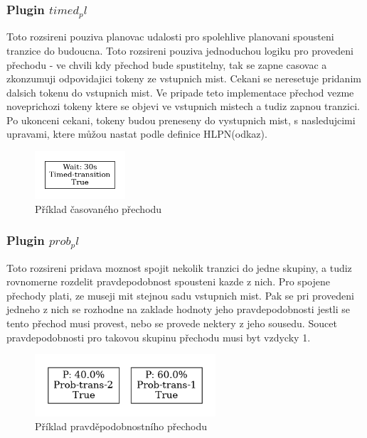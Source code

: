 \subsubsection{Plugin $timed_pl$}
\label{subsec:timed_pl}
Toto rozsireni pouziva planovac udalosti pro spolehlive planovani spousteni tranzice do budoucna. Toto rozsireni pouziva jednoduchou logiku pro provedeni přechodu - ve chvili kdy přechod bude spustitelny, tak se zapne casovac a zkonzumuji odpovidajici tokeny ze vstupnich mist. Cekani se neresetuje pridanim dalsich tokenu do vstupnich mist. Ve pripade teto implementace přechod vezme noveprichozi tokeny ktere se objevi ve vstupnich mistech a tudiz zapnou tranzici. Po ukonceni cekani, tokeny budou preneseny do vystupnich mist, s nasledujcimi upravami, ktere můžou nastat podle definice HLPN(odkaz).
\begin{figure}[hbt]
  \centering
  \includegraphics[width=0.3\textwidth]{obrazky-figures/timed-transition.png}
  \caption{Příklad časovaného přechodu}
  \label{timed-transition}
\end{figure}

\subsubsection{Plugin $prob_pl$}
\label{subsec:prob_pl}
Toto rozsireni pridava moznost spojit nekolik tranzici do jedne skupiny, a tudiz rovnomerne rozdelit pravdepodobnost spousteni kazde z nich. Pro spojene přechody plati, ze museji mit stejnou sadu vstupnich mist. Pak se pri provedeni jedneho z nich se rozhodne na zaklade hodnoty jeho pravdepodobnosti jestli se tento přechod musi provest, nebo se provede nektery z jeho sousedu. Soucet pravdepodobnosti pro takovou skupinu přechodu musi byt vzdycky 1.
\begin{figure}[hbt]
  \centering
  \includegraphics[width=0.6\textwidth]{obrazky-figures/prob-transition.png}
  \caption{Příklad pravděpodobnostního přechodu}
  \label{prob-transition}
\end{figure}

